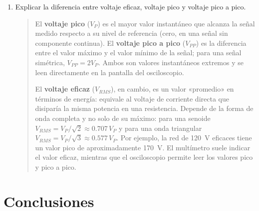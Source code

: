 \documentclass{article}
\begin{document}
\begin{enumerate}
        \item Explicar la diferencia entre voltaje eficaz, voltaje pico y voltaje pico a pico.

        \begin{quote}
            El \textbf{voltaje pico} ($V_P$) es el mayor valor instantáneo que alcanza la señal medido respecto a su nivel de referencia (cero, en una señal sin componente continua). El \textbf{voltaje pico a pico} ($V_{PP}$) es la diferencia entre el valor máximo y el valor mínimo de la señal; para una señal simétrica, $V_{PP} = 2V_P$. Ambos son valores instantáneos extremos y se leen directamente en la pantalla del osciloscopio.

            El \textbf{voltaje eficaz} ($V_{RMS}$), en cambio, es un valor «promedio» en términos de energía: equivale al voltaje de corriente directa que disiparía la misma potencia en una resistencia. Depende de la forma de onda completa y no solo de su máximo: para una senoide $V_{RMS} = V_P/\sqrt{2} \approx 0.707\,V_P$ y para una onda triangular $V_{RMS} = V_P/\sqrt{3} \approx 0.577\,V_P$. Por ejemplo, la red de \SI{120}{\volt} eficaces tiene un valor pico de aproximadamente \SI{170}{\volt}. El multímetro suele indicar el valor eficaz, mientras que el osciloscopio permite leer los valores pico y pico a pico.
        \end{quote}
    \end{enumerate}

    \section{Conclusiones}
\end{document}
